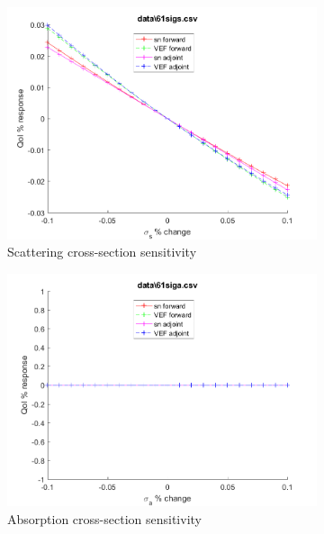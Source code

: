 \documentclass{article}
\begin{document}
\begin{figure}[H]
\begin{subfigure}{.5\textwidth}
  \includegraphics[width=.98\linewidth]{IanProposal/figures2/61sigsSens.png}
  \caption{Scattering cross-section sensitivity}
  \label{fig:sfig2}
\end{subfigure}%
\begin{subfigure}{.5\textwidth}
  \centering
  \includegraphics[width=.98\linewidth]{IanProposal/figures2/61sigaSens.png}
  \caption{Absorption cross-section sensitivity}
  \label{fig:sfig5}
\end{subfigure}%
\caption{}
\label{fig:fig}
\end{figure}
\newpage

\end{document}
